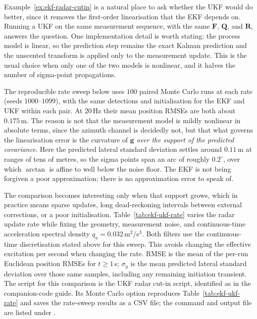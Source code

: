 \begin{example}
\label{ex:ukf-radar-cutin}
Example~\ref{ex:ekf-radar-cutin} is a natural place to ask whether the UKF
would do better, since it removes the first-order linearisation that the EKF
depends on. Running a UKF on the same measurement sequence, with the same
$\mathbf{F}$, $\mathbf{Q}$, and $\mathbf{R}$, answers the question. One
implementation detail is worth stating: the process model is linear, so the
prediction step remains the exact Kalman prediction and the unscented transform
is applied only to the measurement update. This is the usual choice when only
one of the two models is nonlinear, and it halves the number of sigma-point
propagations.

The reproducible rate sweep below uses $100$ paired Monte Carlo runs at each rate (seeds $1000$--$1099$), with the same detections and initialisation for the EKF and UKF within each pair. At $20$\,Hz their mean position RMSEs are both about $0.175$\,m. The reason is not that the measurement model is
mildly nonlinear in absolute terms, since the azimuth channel is decidedly not,
but that what governs the linearisation error is the curvature of
$\mathbf{g}$ \emph{over the support of the predicted covariance}. Here the
predicted lateral standard deviation settles around $0.11$\,m at ranges of tens
of metres, so the sigma points span an arc of roughly $0.2^{\circ}$, over which
$\arctan$ is affine to well below the noise floor. The EKF is not being
forgiven a poor approximation; there is no approximation error to speak of.

The comparison becomes interesting only when that support grows, which in
practice means sparse updates, long dead-reckoning intervals between external
corrections, or a poor initialisation. Table~\ref{tab:ekf-ukf-rate} varies the
radar update rate while fixing the geometry, measurement noise, and continuous-time acceleration spectral density $q_a=0.032$\,m$^2$/s$^3$. Both filters use the continuous-time discretisation stated above for this sweep. This avoids changing the effective excitation per second when changing the rate. RMSE is the mean of the per-run Euclidean position RMSEs for $t\ge1$\,s; $\sigma_y$ is the mean predicted lateral standard deviation over those same samples, including any remaining initiation transient. The script for this comparison is the UKF radar cut-in script, identified as  in the companion-code guide. Its Monte Carlo option reproduces Table~\ref{tab:ekf-ukf-rate} and saves the rate-sweep results as a CSV file; the command and output file are listed under .


\end{example}
